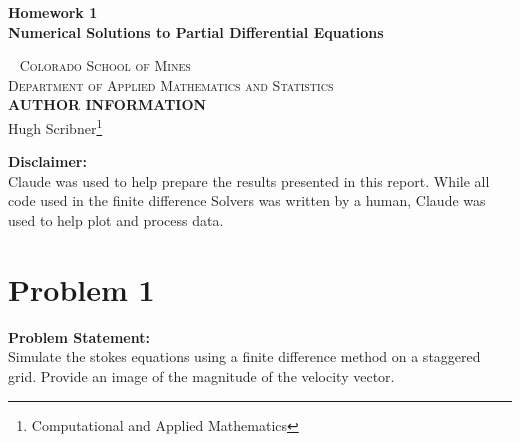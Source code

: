 \documentclass[12pt]{article}
\begin{document}
\newpage
\newpage
\newtheorem{theorem}{Theorem}

\begin{titlepage}

    \begin{center}
        \vspace*{2.5in}
            \huge
            \textbf{{Homework 1}}\\
            \large
            \textbf{Numerical Solutions to Partial Differential Equations}\\
    \end{center}
    ~\vfill
    \noindent \textsc{Colorado School of Mines}\\
    \textsc{Department of Applied Mathematics and Statistics}\\
    
    \vspace{1cm}
    \noindent \textsc{\textbf{AUTHOR INFORMATION}}\\
    \noindent Hugh Scribner\footnote{Computational and Applied Mathematics}\\ 
    \vspace{1mm}
    
\end{titlepage}

\newpage

\tableofcontents

\vfill

\begin{tcolorbox}[colback=orange!10, colframe=orange!80!black]
        \textbf{Disclaimer:}\\
        Claude was used to help prepare the results presented in this report. While all code used in the finite difference Solvers was written by a human, Claude was used to help plot and process data.
    \end{tcolorbox}
\newpage

\newpage
\section{Problem 1}
 \begin{tcolorbox}
        \textbf{Problem Statement:}\\
        Simulate the stokes equations using a finite difference method on a staggered grid. Provide an image of the magnitude of the velocity vector.
    \end{tcolorbox}
    
\end{document}
